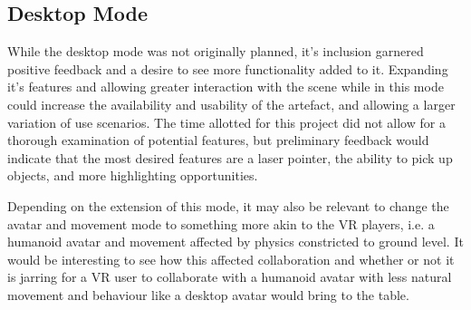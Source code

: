 \subsection{Desktop Mode}
While the desktop mode was not originally planned, it's inclusion garnered positive feedback and a desire to see more functionality added to it. Expanding it's features and allowing greater interaction with the scene while in this mode could increase the availability and usability of the artefact, and allowing a larger variation of use scenarios. The time allotted for this project did not allow for a thorough examination of potential features, but preliminary feedback would indicate that the most desired features are a laser pointer, the ability to pick up objects, and more highlighting opportunities.

Depending on the extension of this mode, it may also be relevant to change the avatar and movement mode to something more akin to the VR players, i.e. a humanoid avatar and movement affected by physics constricted to ground level. It would be interesting to see how this affected collaboration and whether or not it is jarring for a VR user to collaborate with a humanoid avatar with less natural movement and behaviour like a desktop avatar would bring to the table.


\cleardoublepage